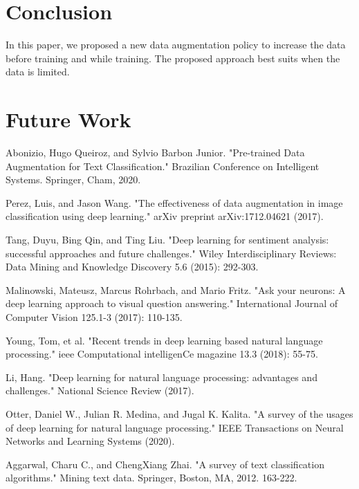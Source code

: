 \documentclass{article}
\begin{document}
\section{Conclusion}
In this paper, we proposed a new data augmentation policy to increase the data before training and while training. The proposed approach best suits when the data is limited.
\section{Future Work}
\begin{thebibliography}{10}




 Abonizio, Hugo Queiroz, and Sylvio Barbon Junior. "Pre-trained Data Augmentation for Text Classification." Brazilian Conference on Intelligent Systems. Springer, Cham, 2020.

 Perez, Luis, and Jason Wang. "The effectiveness of data augmentation in image classification using deep learning." arXiv preprint arXiv:1712.04621 (2017).

 Tang, Duyu, Bing Qin, and Ting Liu. "Deep learning for sentiment analysis: successful approaches and future challenges." Wiley Interdisciplinary Reviews: Data Mining and Knowledge Discovery 5.6 (2015): 292-303.

 Malinowski, Mateusz, Marcus Rohrbach, and Mario Fritz. "Ask your neurons: A deep learning approach to visual question answering." International Journal of Computer Vision 125.1-3 (2017): 110-135.

 Young, Tom, et al. "Recent trends in deep learning based natural language processing." ieee Computational intelligenCe magazine 13.3 (2018): 55-75.

 Li, Hang. "Deep learning for natural language processing: advantages and challenges." National Science Review (2017).

 Otter, Daniel W., Julian R. Medina, and Jugal K. Kalita. "A survey of the usages of deep learning for natural language processing." IEEE Transactions on Neural Networks and Learning Systems (2020).

 Aggarwal, Charu C., and ChengXiang Zhai. "A survey of text classification algorithms." Mining text data. Springer, Boston, MA, 2012. 163-222.




\end{thebibliography}
\end{document}
